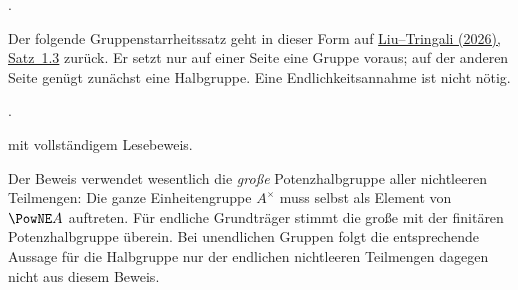 \documentclass[main.tex]{subfiles}
\begin{document}
\begingroup
\ProofWideReasonsNearFormula
\begin{tabproofwide}
\end{tabproofwide}
\endgroup

\par\noindent{}.\par


Der folgende Gruppenstarrheitssatz geht in dieser Form auf
\href{https://doi.org/10.48550/arXiv.2606.01917}%
  {Liu--Tringali (2026), Satz~1.3}
zurück. Er setzt nur auf einer Seite eine Gruppe voraus; auf der anderen
Seite genügt zunächst eine Halbgruppe. Eine Endlichkeitsannahme ist nicht nötig.

\par\noindent{}.\par
\noindent\ReconstructionReadingLink{} mit vollständigem Lesebeweis.\par


\begin{remark}
Der Beweis verwendet wesentlich die \emph{große} Potenzhalbgruppe aller
nichtleeren Teilmengen: Die ganze Einheitengruppe \(A^\times\) muss selbst
als Element von \(\PowNE A\) auftreten.  Für endliche Grundträger stimmt
die große mit der finitären Potenzhalbgruppe überein.  Bei unendlichen
Gruppen folgt die entsprechende Aussage für die Halbgruppe nur der
endlichen nichtleeren Teilmengen dagegen nicht aus diesem Beweis.
\end{remark}
\end{document}
